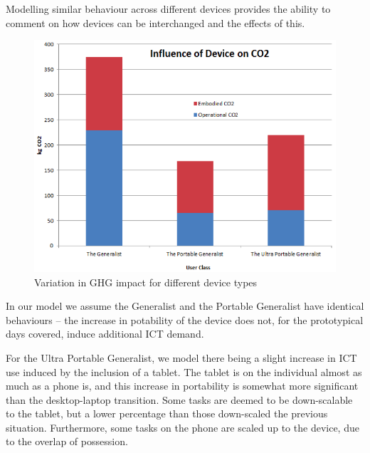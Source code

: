\documentclass[conference]{IEEEtran}
\begin{document}
Modelling similar behaviour across different devices provides the
ability to comment on how devices can be interchanged and the effects
of this.


\begin{figure}[!ht]
\centering
\includegraphics[width=0.9\columnwidth]{images/ghgimpact_devicetypes.png}
\caption{Variation in GHG impact for different device types}
\label{fig:ghgimpact_devicetype} 
\end{figure}

In our model we assume the Generalist and the Portable Generalist have
identical behaviours -- the increase in potability of the device does
not, for the prototypical days covered, induce additional ICT demand.


For the Ultra Portable Generalist, we model there being a slight
increase in ICT use induced by the inclusion of a tablet. The tablet is
on the individual almost as much as a phone is, and this increase in
portability is somewhat more significant than the desktop-laptop
transition. Some tasks are deemed to be down-scalable to the tablet,
but a lower percentage than those down-scaled the previous
situation. Furthermore, some tasks on the phone are scaled up to the
device, due to the overlap of possession.
\end{document}
